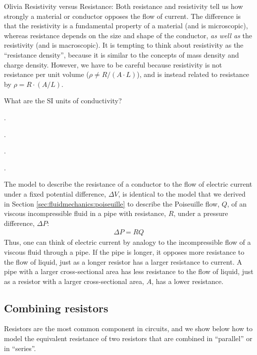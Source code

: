 \begin{studentOpinion}{Olivia}
Resistivity versus Resistance: Both resistance and resistivity tell us how strongly a material or conductor opposes the flow of current. The difference is that the resistivity is a fundamental property of a material (and is microscopic), whereas resistance depends on the size and shape of the conductor, \textit{as well as} the resistivity (and is macroscopic). It is tempting to think about resistivity as the ``resistance density'', because it is similar to the concepts of mass density and charge density. However, we have to be careful because resistivity is not resistance per unit volume ($\rho \neq R/(A\cdot L)$), and is instead related to resistance by $\rho=R\cdot (A/L)$.


\end{studentOpinion}

\begin{checkpoint}
	\begin{MCquestion}{What are the SI units of conductivity?}
		\item \SI{}{}.
		\item \SI{}{}. \correct
		\item \SI{}{}.
		\item \SI{}{}.
	\end{MCquestion}
\end{checkpoint}


The model to describe the resistance of a conductor to the flow of electric current under a fixed potential difference, $\Delta V$, is identical to the model that we derived in Section \ref{sec:fluidmechanics:poiseuille} to describe the Poiseuille flow, $Q$, of an viscous incompressible fluid in a pipe with resistance, $R$, under a pressure difference, $\Delta P$:
\begin{align*}
\Delta P = RQ
\end{align*}
Thus, one can think of electric current by analogy to the incompressible flow of a viscous fluid through a pipe. If the pipe is longer, it opposes more resistance to the flow of liquid, just as a longer resistor has a larger resistance to current. A pipe with a larger cross-sectional area has less resistance to the flow of liquid, just as a resistor with a larger cross-sectional area, $A$, has a lower resistance.
\subsection{Combining resistors}
Resistors are the most common component in circuits, and we show below how to model the equivalent resistance of two resistors that are combined in ``parallel'' or in ``series''.

